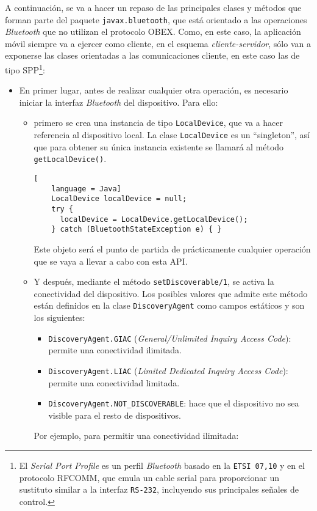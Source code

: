 A continuación, se va a hacer un repaso de las principales clases y métodos
que forman parte del paquete \texttt{javax.bluetooth}, que está orientado a 
las operaciones \emph{Bluetooth} que no utilizan el protocolo \acs{OBEX}.
Como, en este caso, la aplicación móvil siempre va a ejercer como 
cliente, en el esquema \emph{cliente-servidor}, sólo van a exponerse las
clases orientadas a las comunicaciones cliente, en este caso las de tipo
\acs{SPP}\footnote{El \emph{Serial Port Profile} es un perfil \emph{Bluetooth} 
basado en la \texttt{\acs{ETSI} 07,10} y en el protocolo \acs{RFCOMM}, que
emula un cable serial para proporcionar un sustituto similar a la interfaz
\texttt{RS-232}, incluyendo sus principales señales de control.}:
\begin{itemize}
\item En primer lugar, antes de realizar cualquier otra operación, es necesario
iniciar la interfaz \emph{Bluetooth} del dispositivo. Para ello:
  \begin{itemize}
  \item primero se crea una instancia de tipo \texttt{LocalDevice}, que va a 
  hacer referencia al dispositivo local. La clase \texttt{LocalDevice} es un 
  ``singleton'', así que para obtener su única instancia existente se llamará 
  al método \texttt{getLocalDevice()}.

  \begin{lstlisting}[
    language = Java]
    LocalDevice localDevice = null;
    try {
      localDevice = LocalDevice.getLocalDevice();
    } catch (BluetoothStateException e) { }
  \end{lstlisting}

  Este objeto será el punto de partida de prácticamente cualquier operación
  que se vaya a llevar a cabo con esta \acs{API}.

  \item Y después, mediante el método \texttt{setDiscoverable/1}, se activa la 
  conectividad del dispositivo. Los posibles valores que admite este método
  están definidos en la clase \texttt{DiscoveryAgent} como campos estáticos y
  son los siguientes:
    \begin{itemize}
    \item \texttt{DiscoveryAgent.GIAC} (\emph{General/Unlimited Inquiry Access
    Code}): permite una conectividad ilimitada.
    \item \texttt{DiscoveryAgent.LIAC} (\emph{Limited Dedicated Inquiry Access
    Code}): permite una conectividad limitada.
    \item \texttt{DiscoveryAgent.NOT\_DISCOVERABLE}: hace que el dispositivo
    no sea visible para el resto de dispositivos.
    \end{itemize}
  Por ejemplo, para permitir una conectividad ilimitada:


\end{itemize}
\end{itemize}
